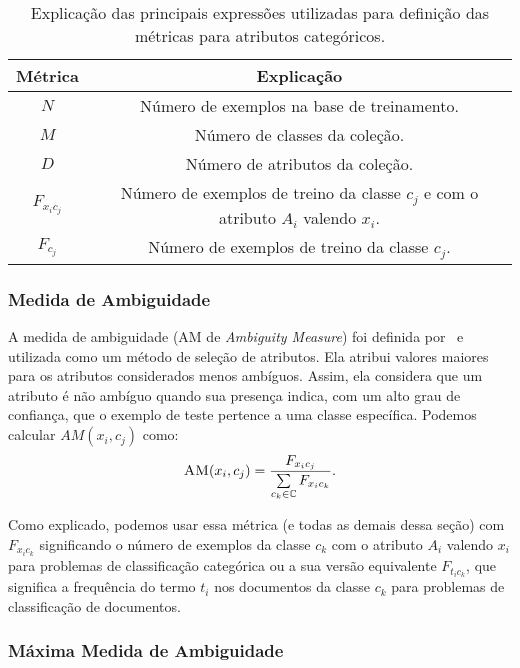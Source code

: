 \begin{table}[ht*]
\centering
\begin{tabular}{|c|c|}
\toprule
    \textbf{Métrica} & \textbf{Explicação} \\
\midrule
    $N$           & Número de exemplos na base de treinamento. \tabularnewline \hline
    $M$           & Número de classes da coleção. \tabularnewline \hline
    $D$           & Número de atributos da coleção. \tabularnewline \hline
    $F_{x_ic_j}$  & Número de exemplos de treino da classe $c_j$ e com o atributo $A_i$ valendo $x_i$. \tabularnewline \hline
    $F_{c_j}$     & Número de exemplos de treino da classe $c_j$. \tabularnewline 
\bottomrule
\end{tabular}
\caption{Explicação das principais expressões utilizadas para definição das métricas para atributos categóricos.}
\label{table::metricas_textuais_categoricos}
\end{table}

\subsubsection{Medida de Ambiguidade} %
\label{subsubsection::am}

A medida de ambiguidade (\textsc{AM} de \textit{Ambiguity Measure}) foi definida por~\cite{Mengle08} e utilizada como um método de seleção de atributos. Ela atribui valores maiores para os atributos considerados menos ambíguos. Assim, ela considera que um atributo é não ambíguo quando sua presença indica, com um alto grau de confiança, que o exemplo de teste pertence a uma classe específica. Podemos calcular $AM(x_i, c_j)$ como:
\begin{equation}\label{eqn::am}
 \textsc{AM}(x_i, c_j) = \frac{ F_{x_{i}c_{j}}}{\sum\limits_{c_k \in \mathbb{C}} F_{x_{i}c_{k}}}.
\end{equation}

Como explicado, podemos usar essa métrica (e todas as demais dessa seção) com $F_{x_{i}c_{k}}$ significando o número de exemplos da classe $c_k$ com o atributo $A_i$ valendo $x_i$ para problemas de classificação categórica ou a sua versão equivalente $F_{t_{i}c_{k}}$, que significa a frequência do termo $t_i$ nos documentos da classe $c_k$ para problemas de classificação de documentos.

\subsubsection{Máxima Medida de Ambiguidade}
\label{subsubsection::maxam}

